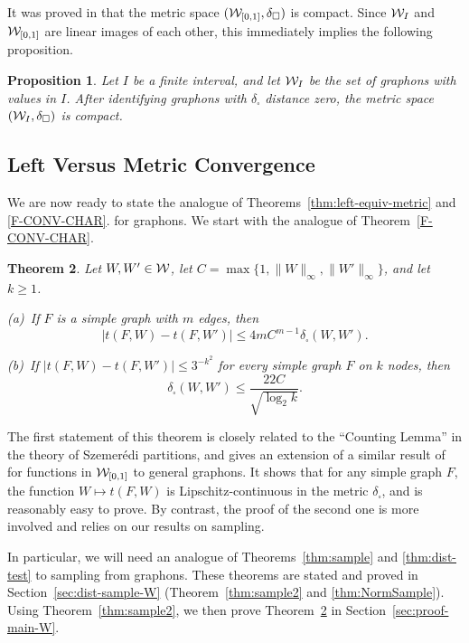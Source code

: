 \documentclass[12pt]{article}
\newtheorem{theorem}{Theorem}[section]
\newtheorem{prop}[theorem]{Proposition}
\numberwithin{equation}{section}
\def\WWz{{\WW_{[0,1]}}}
\begin{document}
It was proved in \cite{LSz3} that the metric space
$(\WWz,\delta_\square)$ is compact. Since ${\cal W}_I$ and $\WWz$
are linear images of each other, this immediately implies the
following proposition.

\begin{prop}\label{thm:compact}
Let $I$ be a finite interval, and let ${\cal W}_I$ be the set of graphons
with values in $I$. After identifying graphons with $\delta_\square$
distance zero, the metric space $({\cal W}_I,\delta_\square)$ is compact.
\end{prop}

\subsection{Left Versus Metric Convergence}\label{sec:Left-Metric-W}

We are now ready to state the analogue of
Theorems~\ref{thm:left-equiv-metric} and \ref{F-CONV-CHAR}.
for graphons. We start with the analogue of
Theorem~\ref{F-CONV-CHAR}.

\begin{theorem}\label{W-CONV-CHAR}
Let $W,W'\in{\cal W}$, let $C=\max\{1,\|W\|_\infty,\|W'\|_\infty\}$, and
let $k\geq 1$.

\smallskip

{\rm (a)}~If  $F$ is a simple graph with $m$ edges, then
\begin{equation}
\label{LEFTDIST-delta} |t(F,W)-t(F,W')|\le 4 mC^{m-1}{
\delta_\square(W,W')}.
\end{equation}

\smallskip

{\rm (b)}~If
$
|t(F,W)-t(F,W')|\leq 3^{-{k^2}}
$
for every simple graph $F$ on $k$ nodes, then
\[
\delta_\square(W, W') \le \frac{22C}{\sqrt{\log_2 k}}.
\]
\end{theorem}

The first statement of this theorem is closely related to the
``Counting Lemma'' in the theory of Szemer\'edi partitions, and
gives an extension of a similar result of \cite{LSz1} for functions
in $\WWz$ to general graphons. It shows that for any simple graph
$F$, the function $W\mapsto t(F,W)$ is Lipschitz-continuous in the
metric $\delta_\square$, and is reasonably easy to prove. By
contrast, the proof of the second one is more involved and relies on
our results on sampling.

In particular, we will need an analogue of Theorems~\ref{thm:sample}
and \ref{thm:dist-test} to sampling from graphons. These theorems
are stated and proved in Section~\ref{sec:dist-sample-W}
(Theorem~\ref{thm:sample2} and \ref{thm:NormSample}). Using
Theorem~\ref{thm:sample2}, we then prove Theorem~\ref{W-CONV-CHAR}
in  Section~\ref{sec:proof-main-W}.
\end{document}
